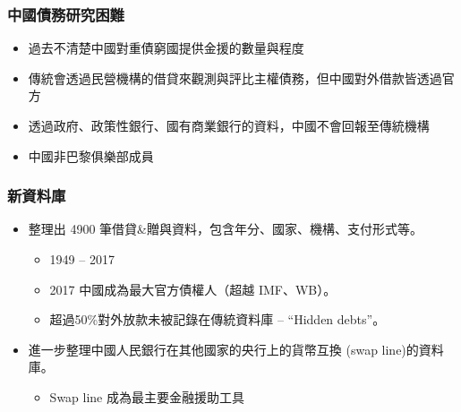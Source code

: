 \begin{frame}
    \frametitle{中國債務研究困難}

    \begin{itemize}
        \item 過去不清楚中國對重債窮國提供金援的數量與程度
        \item 傳統會透過民營機構的借貸來觀測與評比主權債務，但中國對外借款皆透過官方
        \item 透過政府、政策性銀行、國有商業銀行的資料，中國不會回報至傳統機構
        \item 中國非巴黎俱樂部成員
    \end{itemize}

\end{frame}


\begin{frame}
    \frametitle{新資料庫}

    \begin{itemize}
        \item \citet*{Horn-Reinhart-Trebesch-21} 整理出 4900 筆借貸\&贈與資料，包含年分、國家、機構、支付形式等。
        \begin{itemize}
            \item 1949 -- 2017
            \item  2017 中國成為最大官方債權人（超越 IMF、WB）。
            \item 超過50\%對外放款未被記錄在傳統資料庫 -- ``Hidden debts''。
        \end{itemize}
        \item \citet*{HPRT-23} 進一步整理中國人民銀行\footnotemark{}在其他國家的央行上的貨幣互換 (swap line)的資料庫。
        \begin{itemize}
            \item Swap line 成為最主要金融援助工具
        \end{itemize}
    \end{itemize}


\end{frame}